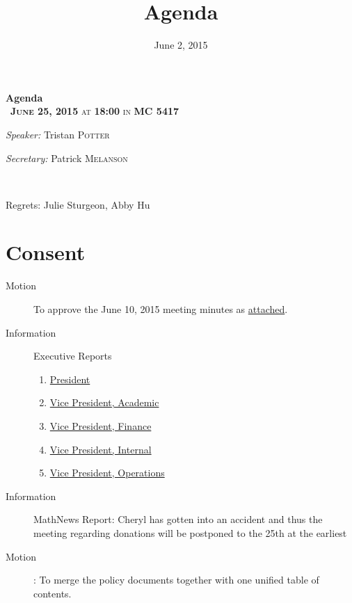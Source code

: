 \documentclass[12pt, letterpaper]{article}
\title{Agenda}
\date{June 2, 2015}
\newcommand{\meetingDate}{June 25, 2015}
\newcommand{\meetingTime}{18:00}
\newcommand{\meetingLocation}{MC 5417}
\begin{document}
\hypersetup{} %


\begin{center}
{ \huge \bfseries Agenda \\[0.4cm] }
{\textsc{~\textbf{\meetingDate} at \textbf{\meetingTime} in \textbf{\meetingLocation}}}
\\[0.2cm]

\begin{minipage}[t]{0.5\textwidth}
\begin{flushleft} \large
\emph{Speaker:}
Tristan \textsc{Potter}
\end{flushleft}
\end{minipage}%
\begin{minipage}[t]{0.5\textwidth}
\begin{flushright} \large
\emph{Secretary:} 
Patrick \textsc{Melanson}
\end{flushright}
\end{minipage}

\HRule \\[0.4cm]
\end{center}

Regrets: Julie Sturgeon, Abby Hu
\section*{Consent}
\begin{description}
	\item[Motion] To approve the June 10, 2015 meeting minutes as \hyperref[minutes]{attached}.
	\item[Information] Executive Reports
	\begin{enumerate}
		\item \hyperref[president]{President}
		\item \hyperref[vpacademic]{Vice President, Academic}
		\item \hyperref[vpfinance]{Vice President, Finance}
		\item \hyperref[vpinternal]{Vice President, Internal}
		\item \hyperref[vpoperations]{Vice President, Operations}
	\end{enumerate}
	\item[Information] MathNews Report: Cheryl has gotten into an accident and thus the meeting regarding donations will be postponed to the 25th at the earliest
	\item[Motion]: To merge the policy documents together with one unified table of contents. 
\end{description}
\HRule
\end{document}
